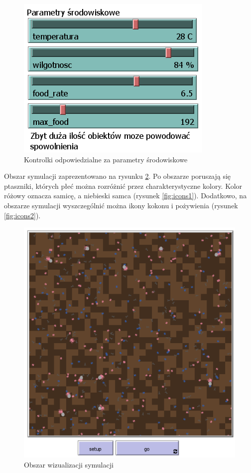 \documentclass[a4paper,11pt,titlepage]{article}
\begin{document}
\begin{figure}[H]
\centering
\includegraphics[width=.5\columnwidth]{img/parametry_env.PNG}
\caption{Kontrolki odpowiedzialne za parametry środowiskowe}
\label{fig:4}
\end{figure}

Obszar symulacji zaprezentowano na rysunku \ref{fig:1}. Po obszarze poruszają się ptaszniki, których płeć można rozróżnić przez charakterystyczne kolory. Kolor różowy oznacza samicę, a niebieski samca (rysunek \ref{fig:icons1}). Dodatkowo, na obszarze symulacji wyszczególnić można ikony kokonu i pożywienia (rysunek \ref{fig:icons2}).
\begin{figure}[H]
\centering
\includegraphics[width=.75\columnwidth]{img/map.PNG}
\caption{Obszar wizualizacji symulacji}
\label{fig:1}
\end{figure}
\end{document}

